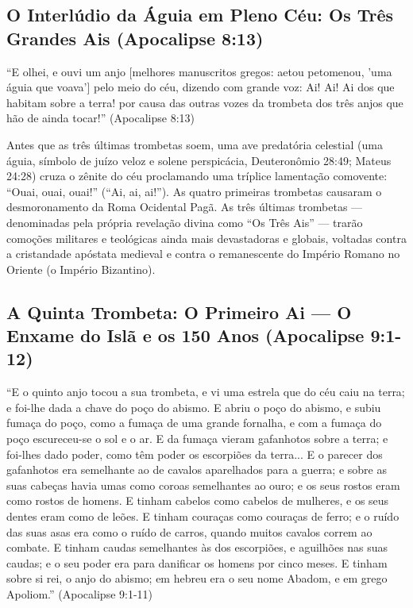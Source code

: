 \subsection{O Interlúdio da Águia em Pleno Céu: Os Três Grandes Ais (Apocalipse 8:13)}


``E olhei, e ouvi um anjo [melhores manuscritos gregos: aetou petomenou, 'uma águia que voava'] pelo meio do céu, dizendo com grande voz: Ai! Ai! Ai dos que habitam sobre a terra! por causa das outras vozes da trombeta dos três anjos que hão de ainda tocar!'' (Apocalipse 8:13)

Antes que as três últimas trombetas soem, uma ave predatória celestial (uma águia, símbolo de juízo veloz e solene perspicácia, Deuteronômio 28:49; Mateus 24:28) cruza o zênite do céu proclamando uma tríplice lamentação comovente: ``Ouai, ouai, ouai!'' (``Ai, ai, ai!'').
As quatro primeiras trombetas causaram o desmoronamento da Roma Ocidental Pagã. As três últimas trombetas — denominadas pela própria revelação divina como ``Os Três Ais'' — trarão comoções militares e teológicas ainda mais devastadoras e globais, voltadas contra a cristandade apóstata medieval e contra o remanescente do Império Romano no Oriente (o Império Bizantino).



\subsection{A Quinta Trombeta: O Primeiro Ai — O Enxame do Islã e os 150 Anos (Apocalipse 9:1-12)}


``E o quinto anjo tocou a sua trombeta, e vi uma estrela que do céu caiu na terra; e foi-lhe dada a chave do poço do abismo. E abriu o poço do abismo, e subiu fumaça do poço, como a fumaça de uma grande fornalha, e com a fumaça do poço escureceu-se o sol e o ar. E da fumaça vieram gafanhotos sobre a terra; e foi-lhes dado poder, como têm poder os escorpiões da terra... E o parecer dos gafanhotos era semelhante ao de cavalos aparelhados para a guerra; e sobre as suas cabeças havia umas como coroas semelhantes ao ouro; e os seus rostos eram como rostos de homens. E tinham cabelos como cabelos de mulheres, e os seus dentes eram como de leões. E tinham couraças como couraças de ferro; e o ruído das suas asas era como o ruído de carros, quando muitos cavalos correm ao combate. E tinham caudas semelhantes às dos escorpiões, e aguilhões nas suas caudas; e o seu poder era para danificar os homens por cinco meses. E tinham sobre si rei, o anjo do abismo; em hebreu era o seu nome Abadom, e em grego Apoliom.'' (Apocalipse 9:1-11)


